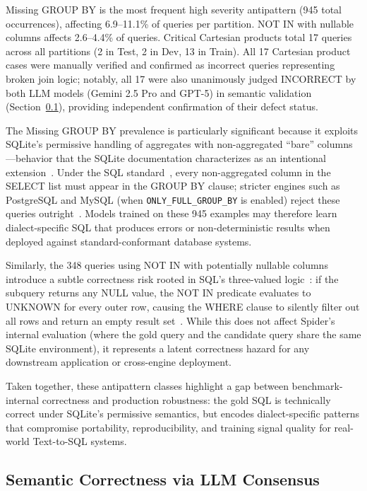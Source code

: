 \documentclass[print]{einformatica}
\begin{document}
Missing GROUP BY is the most frequent high severity antipattern (945 total occurrences), affecting 6.9--11.1\% of queries per partition. NOT IN with nullable columns affects 2.6--4.4\% of queries. Critical Cartesian products total 17 queries across all partitions (2 in Test, 2 in Dev, 13 in Train). All 17 Cartesian product cases were manually verified and confirmed as incorrect queries representing broken join logic; notably, all 17 were also unanimously judged INCORRECT by both LLM models (Gemini 2.5 Pro and GPT-5) in semantic validation (Section~\ref{sec:semantic_results}), providing independent confirmation of their defect status.

The Missing GROUP BY prevalence is particularly significant because it exploits SQLite's permissive handling of aggregates with non-aggregated ``bare'' columns---behavior that the SQLite documentation characterizes as an intentional extension~\cite{sqliteBareColumns}. Under the SQL standard~\cite{iso9075_2_2016}, every non-aggregated column in the SELECT list must appear in the GROUP BY clause; stricter engines such as PostgreSQL and MySQL (when \texttt{ONLY\_FULL\_GROUP\_BY} is enabled) reject these queries outright~\cite{postgresGroupBy,mysqlGroupByHandling}. Models trained on these 945 examples may therefore learn dialect-specific SQL that produces errors or non-deterministic results when deployed against standard-conformant database systems.

Similarly, the 348 queries using NOT IN with potentially nullable columns introduce a subtle correctness risk rooted in SQL's three-valued logic~\cite{iso9075_2_2016}: if the subquery returns any NULL value, the NOT IN predicate evaluates to UNKNOWN for every outer row, causing the WHERE clause to silently filter out all rows and return an empty result set~\cite{karwin2010sqlantipatterns,date2012sqlrelational}. While this does not affect Spider's internal evaluation (where the gold query and the candidate query share the same SQLite environment), it represents a latent correctness hazard for any downstream application or cross-engine deployment.

Taken together, these antipattern classes highlight a gap between benchmark-internal correctness and production robustness: the gold SQL is technically correct under SQLite's permissive semantics, but encodes dialect-specific patterns that compromise portability, reproducibility, and training signal quality for real-world Text-to-SQL systems.

\subsection{Semantic Correctness via LLM Consensus}\label{sec:semantic_results}
\end{document}
